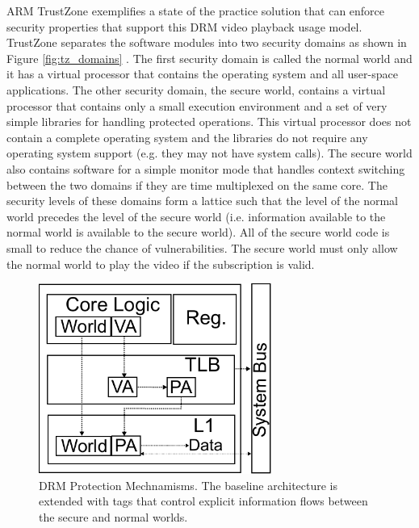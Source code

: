     ARM TrustZone \cite{trustzone} exemplifies a state of the practice solution 
    that can enforce security properties that support this DRM video playback 
    usage model.
    TrustZone separates the software modules into two security domains as shown 
    in Figure \ref{fig:tz_domains} . The first security domain is called the 
    normal world and it has a virtual processor that contains the operating 
    system and all user-space applications. The other security domain, the 
    secure world, contains a virtual processor that contains only a small 
    execution environment and a set of very simple libraries for handling 
    protected operations. This virtual processor does not contain a complete 
    operating system and the libraries do not require any operating system 
    support (e.g. they may not have system calls). The secure world also 
    contains software for a simple monitor mode that handles context switching 
    between the two domains if they are time multiplexed on the same core. The 
    security levels of these domains form a lattice such that the level of the 
    normal world precedes the level of the secure world (i.e. information 
    available to the normal world is available to the secure world). All of the 
    secure world code is small to reduce the chance of vulnerabilities. The 
    secure world must only allow the normal world to play the video if the 
    subscription is valid. 


    \begin{figure}
        \begin{center}
            \includegraphics[width=3in]{figs/tz_tags.pdf}
            \caption{DRM Protection Mechnamisms. The baseline architecture is 
            extended with tags that control explicit information flows between 
        the secure and normal worlds.}
            \label{fig:tz_uarch}
        \end{center}
    \end{figure}

